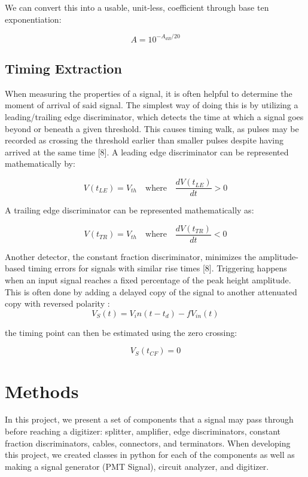 \documentclass[10pt]{article}
\begin{document}
We can convert this into a usable, unit-less, coefficient through base ten exponentiation: 

$$
A = 10^{-A_{dB}/20}
$$


\subsection{Timing Extraction}

When measuring the properties of a signal, it is often helpful to determine the moment of arrival of said signal. The simplest way of doing this is by utilizing a leading/trailing edge discriminator, which detects the time at which a signal goes beyond or beneath a given threshold. This causes timing walk, as pulses may be recorded as crossing the threshold earlier than smaller pulses despite having arrived at the same time [8]. A leading edge discriminator can be represented mathematically by:  

$$
V(t_{LE}) = V_{th} \quad \text{where} \quad \frac{dV(t_{LE})}{dt} > 0
$$

A trailing edge discriminator can be represented mathematically as: 

$$
V(t_{TR}) = V_{th} \quad \text{where} \quad \frac{  dV(t_{TR})   } {dt} < 0
$$


Another detector, the constant fraction discriminator, minimizes the amplitude-based timing errors for signals with similar rise times [8]. Triggering happens when an input signal reaches a fixed percentage of the peak height amplitude. This is often done by adding a delayed copy of the signal to another attenuated copy with reversed polarity :
$$
V_S(t) = V_in(t - t_d) - fV_{in}(t)
$$

the timing point can then be estimated using the zero crossing: 

$$
V_S(t_{CF}) = 0
$$

\section{Methods}
In this project, we present a set  of components that a signal may pass through before reaching a digitizer: splitter, amplifier, edge discriminators, constant fraction discriminators, cables, connectors, and terminators.
When developing this project, we created classes in python for each of the components as well as making a signal generator (PMT Signal), circuit analyzer, and digitizer.
\end{document}
